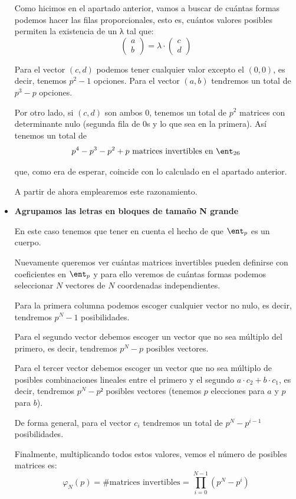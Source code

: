 \begin{itemize}
\begin{remark}
Como hicimos en el apartado anterior, vamos a buscar de cuántas formas podemos hacer las filas proporcionales, esto es, cuántos valores posibles permiten la existencia de un λ tal que:
\[\left( \begin{array}{c}
a \\
b  \end{array} \right) = λ \cdot \left( \begin{array}{c}
c \\
d  \end{array} \right)\]

Para el vector $(c,d)$ podemos tener cualquier valor excepto el $(0,0)$, es decir, tenemos $p^2 -1$ opciones. Para el vector $(a,b)$ tendremos un total de $p^3-p$ opciones.

Por otro lado, si $(c,d)$ son ambos $0$, tenemos un total de $p^2$ matrices con determinante nulo (segunda fila de 0s y lo que sea en la primera). Así tenemos un total de
\[p^4 - p^3 -p^2+p \text{ matrices invertibles en } \ent_{26}\]

que, como era de esperar, coincide con lo calculado en el apartado anterior.

A partir de ahora emplearemos este razonamiento.
\end{remark}
\item \textbf{Agrupamos las letras en bloques de tamaño N grande}

En este caso tenemos que tener en cuenta el hecho de que $\ent_p$ es un cuerpo.

Nuevamente queremos ver cuántas matrices invertibles pueden definirse con coeficientes en $\ent_p$ y para ello veremos de cuántas formas podemos seleccionar $N$ vectores de $N$ coordenadas independientes.

Para la primera columna podemos escoger cualquier vector no nulo, es decir, tendremos $p^N-1$ posibilidades.

Para el segundo vector debemos escoger un vector que no sea múltiplo del primero, es decir, tendremos $p^N-p$ posibles vectores.

Para el tercer vector debemos escoger un vector que no sea múltiplo de posibles combinaciones lineales entre el primero y el segundo $a·c_2 + b·c_1$, es decir, tendremos $p^N - p²$ posibles vectores (tenemos $p$ elecciones para $a$ y $p$ para $b$).

De forma general, para el vector $c_i$ tendremos un total de $p^N-p^{i-1}$ posibilidades.

Finalmente, multiplicando todos estos valores, vemos el número de posibles matrices es:
\[ φ_N(p) = \text{\# matrices invertibles = }\prod_{i=0}^{N-1} (p^N-p^i)\]
\end{itemize}

